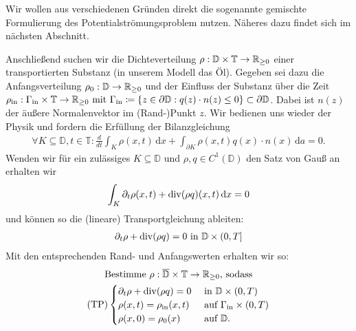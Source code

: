 \begin{Bemerkung}
	Wir wollen aus verschiedenen Gründen direkt die sogenannte gemischte Formulierung des Potentialströmungsproblem nutzen. Näheres dazu findet sich im nächsten Abschnitt.
\end{Bemerkung}
Anschließend suchen wir die Dichteverteilung $\rho: \mathbb{D} \times \mathbb{T} \rightarrow \mathbb{R}_{\geq0} $ einer transportierten Substanz (in unserem Modell das Öl).  \newline
Gegeben sei dazu die Anfangsverteilung $\rho_0: \mathbb{D} \rightarrow \mathbb{R}_{\geq0}$ und der Einfluss der Substanz über die Zeit
$
\rho_{\text{in}} : \Gamma_{\text{in}} \times \mathbb{T} \rightarrow \mathbb{R}_{\geq0} \text{ mit }  \Gamma_{\text{in}} \coloneqq  \{ z \in \partial \mathbb{D}: q(z)\cdot n(z) \leq 0 \} \subset  \partial \mathbb{D}
$.
Dabei ist $n(z)$ der äußere Normalenvektor im (Rand-)Punkt $z$.
Wir bedienen uns wieder der Physik und fordern die Erfüllung der Bilanzgleichung
\begin{align*}
\forall K \subseteq \mathbb{D} , t\in \mathbb{T} : \frac{d}{dt} \int_K \rho(x,t) \, \mathrm{d}x + \int_{\partial K} \rho(x,t)q(x)\cdot n(x) \, \mathrm{d}a = 0.
\end{align*}
Wenden wir für ein zulässiges $K \subseteq \mathbb{D}$ und $\rho,q \in C^1(\mathbb{D})$ den Satz von Gauß an erhalten wir
\begin{align*}
\int_K \partial_t \rho(x,t) + \operatorname{div} (\rho q)(x,t) \, \mathrm{d}x = 0
\end{align*}
und können so die (lineare) Transportgleichung ableiten:
\begin{align*}
\partial_t \rho + \operatorname{div} (\rho q) = 0 \text{ in } \mathbb{D} \times (0,T]
\end{align*}
Mit den entsprechenden Rand- und Anfangswerten erhalten wir so:
\begin{gather*}
\text{Bestimme } \rho: \overline{\mathbb{D}} \times \mathbb{T} \to \mathbb{R}_{\geq 0} \text{, sodass}\\
(\text{TP})
\begin{cases}
\partial_t \rho + \operatorname{div}(\rho q) = 0 &\text{ in } \mathbb{D} \times (0,T)\\
\rho(x,t) = \rho_{\text{in}}(x,t) &\text{ auf } \Gamma_{\text{in}} \times (0,T)\\
\rho(x,0) = \rho_0(x) &\text{ auf } \mathbb{D}.
\end{cases}
\end{gather*}
